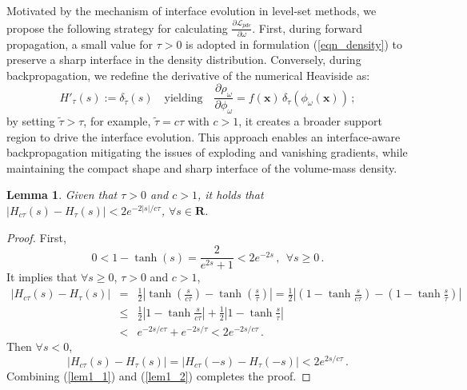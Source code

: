 \documentclass[final,hidelinks,onefignum,onetabnum]{siamart251216}
\newtheorem{lem}[thm]{Lemma}
\begin{document}
Motivated by the mechanism of interface evolution in level-set methods, we propose the following strategy for calculating $\frac{\partial\mathcal{L}_{pde}}{\partial\omega}$. First, during forward propagation, a small value for $\tau>0$ is adopted in formulation (\ref{eqn_density}) to preserve a sharp interface in the density distribution. Conversely, during backpropagation, we redefine the derivative of the numerical Heaviside as:
\begin{equation} \label{eqn3.18}
H'_\tau(s):=\delta_{\tilde{\tau}}(s) \quad \mathrm{yielding}\quad \frac{\partial\rho_\omega}{\partial\phi_\omega}=f(\mathbf{x})\,\delta_{\tilde{\tau}}(\phi_\omega(\mathbf{x}))\,;
\end{equation}
by setting $\tilde{\tau}>\tau$, for example, $\tilde{\tau}=c\tau$ with $c>1$, it creates a broader support region to drive the interface evolution. 
This approach enables an interface-aware backpropagation mitigating the issues of exploding and vanishing gradients, while maintaining the compact shape and sharp interface of the volume-mass density.

\begin{lem} \label{lem1}
Given that $\tau>0$ and $c>1$, it holds that $\left| H_{c\tau}(s) - H_\tau(s) \right|<2 e^{-2|s|/c\tau}$, $\forall s\in\mathbf{R}$.
\end{lem}
\begin{proof}
First, 
\[
0<1-\tanh(s)=\frac{2}{e^{2s}+1}< 2e^{-2s}\,, \ \ \forall s\ge0 \,.
\]
It implies that $\forall s\ge0$, $\tau>0$ and $c>1$,
\begin{eqnarray}
|H_{c\tau}(s) - H_\tau(s)| &=& \frac{1}{2} \left| \tanh\left(\frac{s}{c\tau}\right) - \tanh\left(\frac{s}{\tau}\right) \right|= \frac{1}{2} \left| \left(1 - \tanh\frac{s}{c\tau}\right) - \left(1 - \tanh\frac{s}{\tau}\right) \right| \nonumber \\
&\le&  \frac{1}{2} \left| 1 - \tanh\frac{s}{c\tau} \right| + \frac{1}{2} \left| 1 - \tanh\frac{s}{\tau} \right| \nonumber \\
&<& e^{-2s/c\tau} + e^{-2s/\tau} <2 e^{-2s/c\tau}\,. \label{lem1_1}
\end{eqnarray}
Then $\forall s<0$,
\begin{equation} \label{lem1_2}
|H_{c\tau}(s) - H_\tau(s)|=|H_{c\tau}(-s) - H_\tau(-s)|<2 e^{2s/c\tau}\,.
\end{equation}
Combining (\ref{lem1_1}) and (\ref{lem1_2}) completes the proof.
\end{proof}
\end{document}
